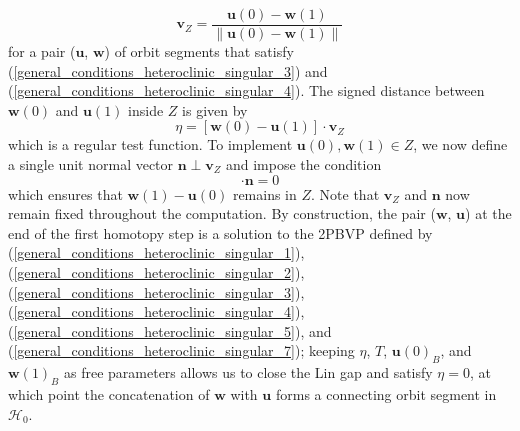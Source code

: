 \documentclass{ws-ijbc}
\begin{document}
	\begin{equation*}
		\mathbf{v}_Z = \frac{\mathbf{u}(0) - \mathbf{w}(1)}{\left\lVert \mathbf{u}(0) - \mathbf{w}(1) \right\lVert}
		\label{Lin_vector_singular}
	\end{equation*}
for a pair ($\mathbf{u}$, $\mathbf{w}$) of orbit segments that satisfy (\ref{general_conditions_heteroclinic_singular_3}) and (\ref{general_conditions_heteroclinic_singular_4}).  The signed distance between $\mathbf{w}(0)$ and $\mathbf{u}(1)$ inside $Z$ is given by
	\begin{equation}
		\eta = [ \mathbf{w}(0)-\mathbf{u}(1) ] \cdot \mathbf{v}_Z
		\label{general_conditions_heteroclinic_singular_5}
	\end{equation}
which is a regular test function.  To implement $\mathbf{u}(0), \mathbf{w}(1) \in Z$, we now define a single unit normal vector $\mathbf{n} \perp \mathbf{v}_Z$ and impose the condition
	\begin{equation}
		[\mathbf{u}(0) - \mathbf{w}(1)] \cdot \mathbf{n} =0
		\label{general_conditions_heteroclinic_singular_7}
	\end{equation}
which ensures that $\mathbf{w}(1)-\mathbf{u}(0)$ remains in $Z$.  Note that $\mathbf{v}_Z$ and $\mathbf{n}$ now remain fixed throughout the computation.  By construction, the pair ($\mathbf{w}$, $\mathbf{u}$) at the end of the first homotopy step is a solution to the 2PBVP defined by (\ref{general_conditions_heteroclinic_singular_1}), (\ref{general_conditions_heteroclinic_singular_2}), (\ref{general_conditions_heteroclinic_singular_3}), (\ref{general_conditions_heteroclinic_singular_4}), (\ref{general_conditions_heteroclinic_singular_5}), and (\ref{general_conditions_heteroclinic_singular_7}); keeping $\eta$, $T$, $\mathbf{u}(0)_B$, and $\mathbf{w}(1)_B$ as free parameters allows us to close the Lin gap and satisfy $\eta = 0$, at which point the concatenation of $\mathbf{w}$ with $\mathbf{u}$ forms a connecting orbit segment in $\mathscr{H}_0$.
\end{document}
